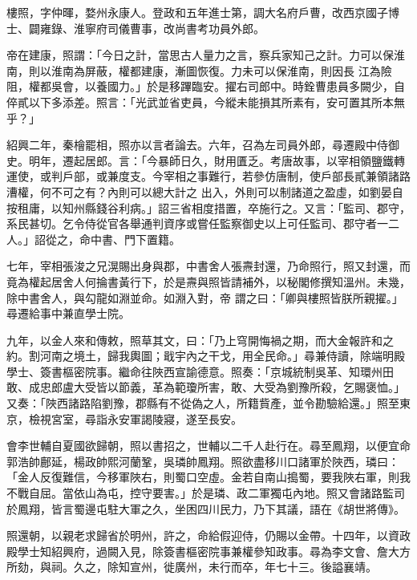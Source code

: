 \begin{pinyinscope}
 樓照，字仲暉，婺州永康人。登政和五年進士第，調大名府戶曹，改西京國子博士、闢雍錄、淮寧府司儀曹事，改尚書考功員外郎。



 帝在建康，照謂：「今日之計，當思古人量力之言，察兵家知己之計。力可以保淮南，則以淮南為屏蔽，權都建康，漸圖恢復。力未可以保淮南，則因長
 江為險阻，權都吳會，以養國力。」於是移蹕臨安。擢右司郎中。時銓曹患員多闕少，自倅貳以下多添差。照言：「光武並省吏員，今縱未能損其所素有，安可置其所本無乎？」



 紹興二年，秦檜罷相，照亦以言者論去。六年，召為左司員外郎，尋遷殿中侍御史。明年，遷起居郎。言：「今暴師日久，財用匱乏。考唐故事，以宰相領鹽鐵轉運使，或判戶部，或兼度支。今宰相之事難行，若參仿唐制，使戶部長貳兼領諸路漕權，何不可之有？內則可以總大計之
 出入，外則可以制諸道之盈虛，如劉晏自按租庸，以知州縣錢谷利病。」詔三省相度措置，卒施行之。又言：「監司、郡守，系民甚切。乞令侍從官各舉通判資序或嘗任監察御史以上可任監司、郡守者一二人。」詔從之，命中書、門下置籍。



 七年，宰相張浚之兄滉賜出身與郡，中書舍人張燾封還，乃命照行，照又封還，而竟為權起居舍人何掄書黃行下，於是燾與照皆請補外，以秘閣修撰知溫州。未幾，除中書舍人，與勾龍如淵並命。如淵入對，帝
 謂之曰：「卿與樓照皆朕所親擢。」尋遷給事中兼直學士院。



 九年，以金人來和傳敕，照草其文，曰：「乃上穹開悔禍之期，而大金報許和之約。割河南之境土，歸我輿圖；戢宇內之干戈，用全民命。」尋兼侍讀，除端明殿學士、簽書樞密院事。繼命往陜西宣諭德意。照奏：「京城統制吳革、知環州田敢、成忠郎盧大受皆以節義，革為範瓊所害，敢、大受為劉豫所殺，乞賜褒恤。」又奏：「陜西諸路陷劉豫，郡縣有不從偽之人，所籍貲產，並令勘驗給還。」照至東
 京，檢視宮室，尋詣永安軍謁陵寢，遂至長安。



 會李世輔自夏國欲歸朝，照以書招之，世輔以二千人赴行在。尋至鳳翔，以便宜命郭浩帥鄜延，楊政帥熙河蘭鞏，吳璘帥鳳翔。照欲盡移川口諸軍於陜西，璘曰：「金人反復難信，今移軍陜右，則蜀口空虛。金若自南山搗蜀，要我陜右軍，則我不戰自屈。當依山為屯，控守要害。」於是璘、政二軍獨屯內地。照又會諸路監司於鳳翔，皆言蜀邊屯駐大軍之久，坐困四川民力，乃下其議，語在《胡世將傳》。



 照還朝，以親老求歸省於明州，許之，命給假迎侍，仍賜以金帶。十四年，以資政殿學士知紹興府，過闕入見，除簽書樞密院事兼權參知政事。尋為李文會、詹大方所劾，與祠。久之，除知宣州，徙廣州，未行而卒，年七十三。後謚襄靖。




\end{pinyinscope}
